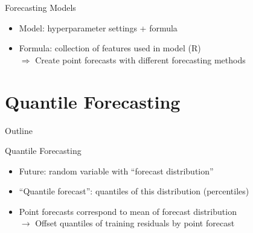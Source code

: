 \documentclass{beamer}
\begin{document}
\begin{frame}{Forecasting Models}
\begin{itemize}
\item Model: hyperparameter settings + formula 
\pause
\item Formula: collection of features used in model (R)\\
\pause
$\Rightarrow$ Create point forecasts with different forecasting methods
\end{itemize}
\end{frame}

\section{Quantile Forecasting}
\begin{frame}[noframenumbering]{Outline}
\tableofcontents[currentsection]
\end{frame}
\begin{frame}{Quantile Forecasting}

\begin{itemize}
\item Future: random variable with ``forecast distribution''
\pause
\item ``Quantile forecast'': quantiles of this distribution (percentiles)
\pause
\item Point forecasts correspond to mean of forecast distribution\\
\pause
$\rightarrow$ Offset \textcolor{bostonuniversityred}{quantiles of training residuals} by point forecast
\end{itemize}

\begin{figure}
\end{figure}


\end{frame}
\end{document}
